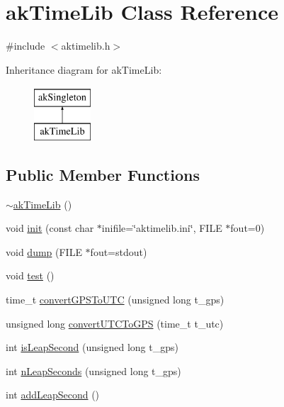 \hypertarget{classakTimeLib}{\section{ak\-Time\-Lib Class Reference}
\label{classakTimeLib}
}


{\ttfamily \#include $<$aktimelib.\-h$>$}

Inheritance diagram for ak\-Time\-Lib\-:\begin{figure}[H]
\begin{center}
\leavevmode
\includegraphics[height=2.000000cm]{classakTimeLib}
\end{center}
\end{figure}
\subsection*{Public Member Functions}
\begin{DoxyCompactItemize}
\item 
\hyperlink{classakTimeLib_a1ed04c2866f3216275ee5253e47e239c}{$\sim$ak\-Time\-Lib} ()
\item 
void \hyperlink{classakTimeLib_aee4282fce5f0ecdd6af03073ad158562}{init} (const char $\ast$inifile=\char`\"{}aktimelib.\-ini\char`\"{}, F\-I\-L\-E $\ast$fout=0)
\item 
void \hyperlink{classakTimeLib_a76f4e184574a8c4e4321c41e63042dd1}{dump} (F\-I\-L\-E $\ast$fout=stdout)
\item 
void \hyperlink{classakTimeLib_a3c925c111c32829c9583d5c5ae4aada2}{test} ()
\item 
time\-\_\-t \hyperlink{classakTimeLib_ae72986916166ba6ceb9dfdcb27821f3a}{convert\-G\-P\-S\-To\-U\-T\-C} (unsigned long t\-\_\-gps)
\item 
unsigned long \hyperlink{classakTimeLib_a100f532636878a9fc17f2d2ebbb56ffb}{convert\-U\-T\-C\-To\-G\-P\-S} (time\-\_\-t t\-\_\-utc)
\item 
int \hyperlink{classakTimeLib_ad96749040ca82dc93bf484bec0b840de}{is\-Leap\-Second} (unsigned long t\-\_\-gps)
\item 
int \hyperlink{classakTimeLib_a678551e52aa31b75fddfaa7716e3ad64}{n\-Leap\-Seconds} (unsigned long t\-\_\-gps)
\item 
int \hyperlink{classakTimeLib_a53076bb547d1f621530e208804eb45c6}{add\-Leap\-Second} ()
\end{DoxyCompactItemize}

